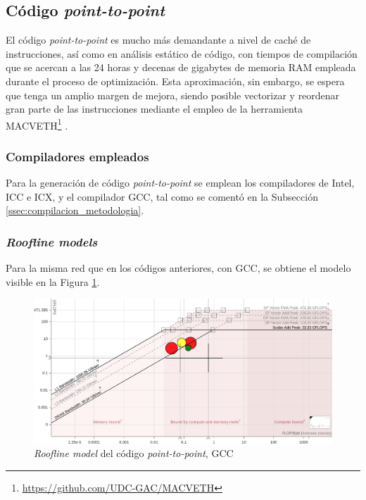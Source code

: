\subsection{Código \textit{point-to-point}}
\label{ssec:codigo_p2p_perfilado}
El código \textit{point-to-point} es mucho más demandante a nivel de caché de instrucciones, así como en análisis estático de código, con tiempos de compilación que se acercan a las 24 horas y decenas de gigabytes de memoria RAM empleada durante el proceso de optimización. Esta aproximación, sin embargo, se espera que tenga un amplio margen de mejora, siendo posible vectorizar y reordenar gran parte de las instrucciones mediante el empleo de la herramienta MACVETH\footnote{\url{https://github.com/UDC-GAC/MACVETH}} \cite{custom_high_performance_vector_codegen_sparse_computations}.

\subsubsection{Compiladores empleados}
Para la generación de código \textit{point-to-point} se emplean los compiladores de Intel, ICC e ICX, y el compilador GCC, tal como se comentó en la Subsección \ref{ssec:compilacion_metodologia}.

\subsubsection{\textit{Roofline models}}
Para la misma red que en los códigos anteriores, con GCC, se obtiene el modelo visible en la Figura \ref{fig:roofline_p2p_gcc}.
\begin{figure}[h!]
    \centering
    \includegraphics[width=\textwidth]{img/rooflines/roofline_p2p_95.png}
    \caption{\textit{Roofline model} del código \textit{point-to-point}, GCC}
    \label{fig:roofline_p2p_gcc}
\end{figure}

